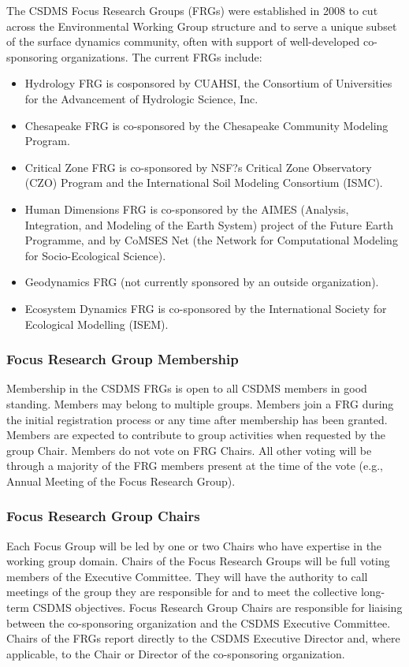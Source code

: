 \documentclass[11pt, oneside]{article}   	%
\begin{document}
The CSDMS Focus Research Groups (FRGs) were established in 2008 to cut across the Environmental Working Group structure and to serve a unique subset of the surface dynamics community, often with support of well-developed co-sponsoring organizations.  The current FRGs include:      
\begin{itemize}
\item	Hydrology FRG is cosponsored by CUAHSI, the Consortium of Universities for the Advancement of Hydrologic Science, Inc.
\item	Chesapeake FRG is co-sponsored by the Chesapeake Community Modeling Program.
\item	Critical Zone FRG is co-sponsored by NSF?s Critical Zone Observatory (CZO) Program and the International Soil Modeling Consortium (ISMC).
\item	Human Dimensions FRG is co-sponsored by the AIMES (Analysis, Integration, and Modeling of the Earth System) project of the Future Earth Programme, and by CoMSES Net (the Network for Computational Modeling for Socio-Ecological Science).
\item	Geodynamics FRG (not currently sponsored by an outside organization).
\item	Ecosystem Dynamics FRG is co-sponsored by the International Society for Ecological Modelling (ISEM). 
\end{itemize}


\subsubsection{Focus Research Group Membership}

Membership in the CSDMS FRGs is open to all CSDMS members in good standing.  Members may belong to multiple groups.  Members join a FRG during the initial registration process or any time after membership has been granted. Members are expected to contribute to group activities when requested by the group Chair. Members do not vote on FRG Chairs. All other voting will be through a majority of the FRG members present at the time of the vote (e.g., Annual Meeting of the Focus Research Group). 

\subsubsection{Focus Research Group Chairs}

Each Focus Group will be led by one or two Chairs who have expertise in the working group domain. Chairs of the Focus Research Groups will be full voting members of the Executive Committee. They will have the authority to call meetings of the group they are responsible for and to meet the collective long-term CSDMS objectives. Focus Research Group Chairs are responsible for liaising between the co-sponsoring organization and the CSDMS Executive Committee.  Chairs of the FRGs report directly to the CSDMS Executive Director and, where applicable, to the Chair or Director of the co-sponsoring organization. 
\end{document}
